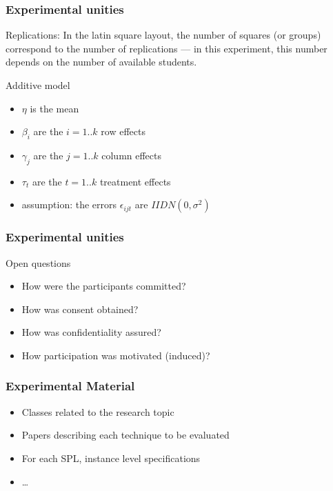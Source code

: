 \documentclass{beamer}
\begin{document}
\begin{frame}
\frametitle{Experimental unities}

\alert{Replications:} In the latin square layout, the number of squares (or
groups) correspond to the number of replications --- in this experiment, this number
depends on the number of available students.

\begin{block}{Additive model}
\begin{scriptsize}
\begin{itemize}
  \item $\eta$ is the mean
  \item $\beta_i$ are the $i = 1 .. k$ row effects
  \item $\gamma_j$ are the $j = 1 .. k$ column effects
  \item $\tau_t$ are the $t = 1 .. k$ treatment effects
  \item assumption: the errors $\epsilon_{ijt}$ are $IIDN(0,\sigma^2)$
\end{itemize}
\end{scriptsize}
\end{block}

\end{frame}

\begin{frame}
\frametitle{Experimental unities}

\begin{block}{Open questions}
\begin{itemize}
  \item How were the participants committed? 
  \item How was consent obtained? 
  \item How was confidentiality assured? 
  \item How participation was motivated (induced)? 
\end{itemize}
\end{block}

\end{frame}

\begin{frame}
\frametitle{Experimental Material}

\begin{itemize}
  \item Classes related to the research topic
  \item Papers describing each technique to be evaluated
  \item For each SPL, instance level specifications
  \item \ldots
\end{itemize}

\end{frame}
\end{document}
